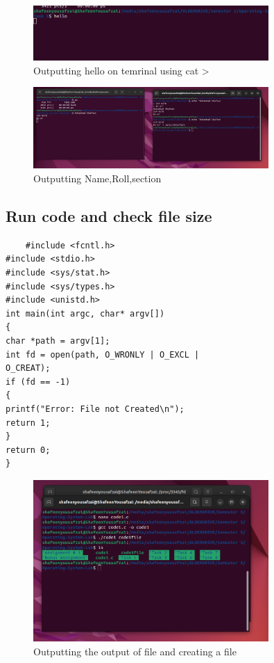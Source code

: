 \documentclass[12pt]{article}
\begin{document}
\begin{figure}[H]
    \centering
    \includegraphics[width=0.8\textwidth]{Screenshot from 2024-10-11 08-20-01.png}
    \caption{Outputting hello on temrinal using cat >}
    \label{fig:enter-label}
\end{figure}

\begin{figure}[H]
    \centering
    \includegraphics[width=0.8\textwidth]{Screenshot from 2024-10-11 08-23-49.png}
    \caption{Outputting Name,Roll,section}
    \label{fig:enter-label}
\end{figure}

\subsection{Run code and check file size}
\begin{verbatim}
    #include <fcntl.h>
#include <stdio.h>
#include <sys/stat.h>
#include <sys/types.h>
#include <unistd.h>
int main(int argc, char* argv[])
{
char *path = argv[1];
int fd = open(path, O_WRONLY | O_EXCL |
O_CREAT);
if (fd == -1)
{
printf("Error: File not Created\n");
return 1;
}
return 0;
}
\end{verbatim}
\begin{figure}[H]
    \centering
    \includegraphics[width=0.8\textwidth]{Screenshot from 2024-10-11 08-38-50.png}
    \caption{Outputting the output of file and creating a file}
    \label{fig:enter-label}
\end{figure}
\end{document}
